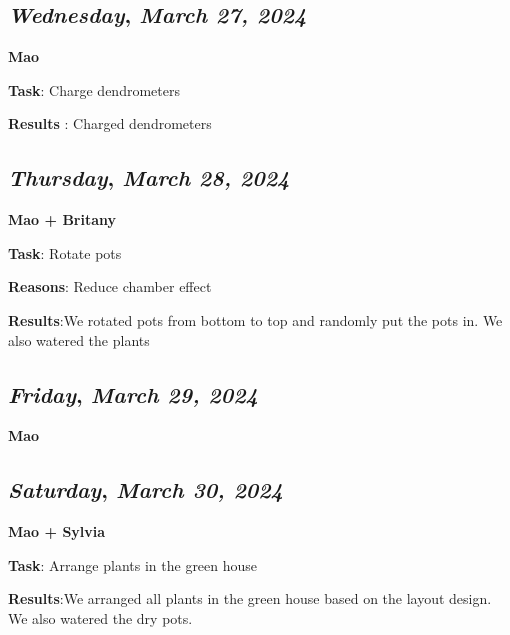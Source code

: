 \def\day{\textit{March 27, 2024}}
\def\weekday{\textit{Wednesday}}
\subsection*{\weekday, \day}
\textbf {Mao}
\par 
\textbf {Task}: Charge dendrometers
\par
\textbf {Results} : Charged dendrometers

\def\day{\textit{March 28, 2024}}
\def\weekday{\textit{Thursday}}
\subsection*{\weekday, \day}
\textbf {Mao + Britany}
\par 
\textbf {Task}: Rotate pots
\par 
\textbf {Reasons}: Reduce chamber effect
\par 
\textbf {Results}:We rotated pots from bottom to top and randomly put the pots in. We also watered the plants

\def\day{\textit{March 29, 2024}}
\def\weekday{\textit{Friday}}
\subsection*{\weekday, \day}
\textbf {Mao}

\def\day{\textit{March 30, 2024}}
\def\weekday{\textit{Saturday}}
\subsection*{\weekday, \day}
\textbf {Mao + Sylvia}
\par 
\textbf {Task}: Arrange plants in the green house
\par 
\textbf {Results}:We arranged all plants in the green house based on the layout design. We also watered the dry pots.
